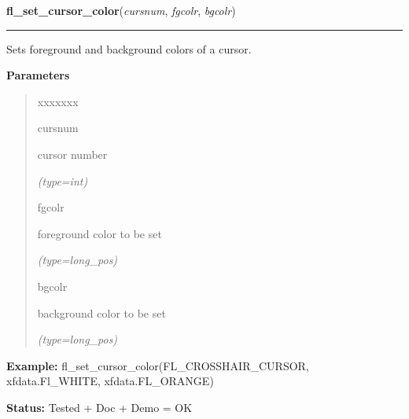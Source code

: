 \hspace{.8\funcindent}\begin{boxedminipage}{\funcwidth}

    \raggedright \textbf{fl\_set\_cursor\_color}(\textit{cursnum}, \textit{fgcolr}, \textit{bgcolr})

    \vspace{-1.5ex}

    \rule{\textwidth}{0.5\fboxrule}
\setlength{\parskip}{2ex}
    Sets foreground and background colors of a cursor.

\setlength{\parskip}{1ex}
      \textbf{Parameters}
      \vspace{-1ex}

      \begin{quote}
        \begin{Ventry}{xxxxxxx}

          \item[cursnum]

          cursor number

            {\it (type=int)}

          \item[fgcolr]

          foreground color to be set

            {\it (type=long\_pos)}

          \item[bgcolr]

          background color to be set

            {\it (type=long\_pos)}

        \end{Ventry}

      \end{quote}

\textbf{Example:} fl\_set\_cursor\_color(FL\_CROSSHAIR\_CURSOR, xfdata.Fl\_WHITE, 
xfdata.FL\_ORANGE)



\textbf{Status:} Tested + Doc + Demo = OK



    \end{boxedminipage}

    \label{xformslib:flcursor:fl_create_bitmap_cursor}

    \vspace{0.5ex}

